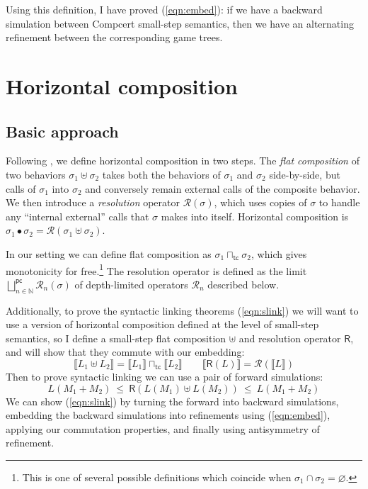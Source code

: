 \documentclass[11pt]{article}
\newcommand{\kw}[1]{{\mathsf{#1}}}
\begin{document}
Using this definition,
I have proved (\ref{eqn:embed}): if we have a backward simulation between
Compcert small-step semantics,
then we have an alternating refinement between
the corresponding game trees.

\section{Horizontal composition}

\subsection{Basic approach}

Following \cite{cpp15},
we define horizontal composition in two steps.
The \emph{flat composition} of two behaviors $\sigma_1 \uplus \sigma_2$
takes both the behaviors of $\sigma_1$ and $\sigma_2$ side-by-side,
but calls of $\sigma_1$ into $\sigma_2$ and conversely remain
external calls of the composite behavior.
We then introduce a \emph{resolution} operator $\mathcal{R}(\sigma)$,
which uses copies of $\sigma$ to handle any ``internal external'' calls
that $\sigma$ makes into itself.
Horizontal composition is
$\sigma_1 \bullet \sigma_2 = \mathcal{R}(\sigma_1 \uplus \sigma_2)$.

In our setting
we can define flat composition as
$\sigma_1 \sqcap_\kw{tc} \sigma_2$,
which gives monotonicity for free.\footnote{%
This is one of several possible definitions which coincide when
$\sigma_1 \cap \sigma_2 = \varnothing$.}
The resolution operator is defined as the limit
$\bigsqcup^\kw{pc}_{n \in \mathbb{N}} \mathcal{R}_n(\sigma)$
of depth-limited operators $\mathcal{R}_n$ described below.

Additionally,
to prove the syntactic linking theorems (\ref{eqn:slink})
we will want to use a version of horizontal composition
defined at the level of small-step semantics,
so I define a small-step flat composition $\uplus$
and resolution operator $\kw{R}$,
and will show that they commute with our embedding:
\[
  \llbracket L_1 \uplus L_2 \rrbracket =
    \llbracket L_1 \rrbracket \sqcap_\kw{tc}
    \llbracket L_2 \rrbracket
  \qquad
  \llbracket \kw{R}(L) \rrbracket =
    \mathcal{R}(\llbracket L \rrbracket)
\]
Then to prove syntactic linking we can use a pair of forward simulations:
\[
  L(M_1 + M_2) \ \le\  \kw{R}(L(M_1) \uplus L(M_2)) \ \le\  L(M_1 + M_2)
\]
We can show (\ref{eqn:slink}) by
turning the forward into backward simulations,
embedding the backward simulations into refinements using (\ref{eqn:embed}),
applying our commutation properties, and
finally using antisymmetry of refinement.
\end{document}
